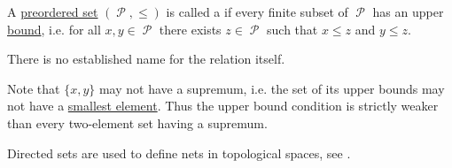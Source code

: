 \begin{definition}\label{def:directed_set}
  A \hyperref[def:preordered_set]{preordered set} \( (\mscrP, \leq) \) is called a  if every finite subset of \( \mscrP \) has an upper \hyperref[def:preordered_set/upper_and_lower_bounds]{bound}, i.e. for all \( x, y \in \mscrP \) there exists \( z \in \mscrP \) such that \( x \leq z \) and \( y \leq z \).

  There is no established name for the relation itself.

  Note that \( \{ x, y \} \) may not have a supremum, i.e. the set of its upper bounds may not have a \hyperref[def:preordered_set/maximum_and_minimum]{smallest element}. Thus the upper bound condition is strictly weaker than every two-element set having a supremum.

  Directed sets are used to define nets in topological spaces, see .
\end{definition}
